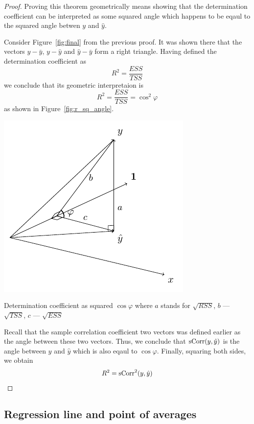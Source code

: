 \begin{proof}
Proving this theorem geometrically means showing that the determination coefficient can be interpreted as some squared angle
which happens to be eqaul to the squared angle betwen $y$ and $\hat y$.

Consider Figure~\ref{fig:final} from the previous proof.
It was shown there that the vectors $y - \bar y$, $y - \hat y$ and $\hat y - \bar y$ form a right triangle.
Having defined the determination coefficient as
\[
R^2 = \frac{ESS}{TSS}
\]
we conclude that its geometric interpretaion is
\[
R^2 = \frac{ESS}{TSS} = \cos^2 \varphi
\]
as shown in Figure~\ref{fig:r_sq_angle}.

\begin{marginfigure}
  \includegraphics{figures/02_determination_coefficient.pdf}
  \caption{Determination coefficient as squared $\cos \varphi$
  where $a$ stands for $\sqrt{RSS}$, $b$ — $\sqrt{TSS}$, $c$ — $\sqrt{ESS}$}
  \label{fig:r_sq_angle}
\end{marginfigure}

Recall that the sample correlation coefficient two vectors was defined earlier as the angle between these two vectors.
Thus, we conclude that $\operatorname{sCorr}(y, \hat y)$ is the angle between $y$ and $\hat y$ which is also eqaul to $\cos \varphi$.
Finally, squaring both sides, we obtain
\[
R^2 = \operatorname{sCorr}^2(y, \hat y)
\]
\end{proof}


\subsection{Regression line and point of averages}

